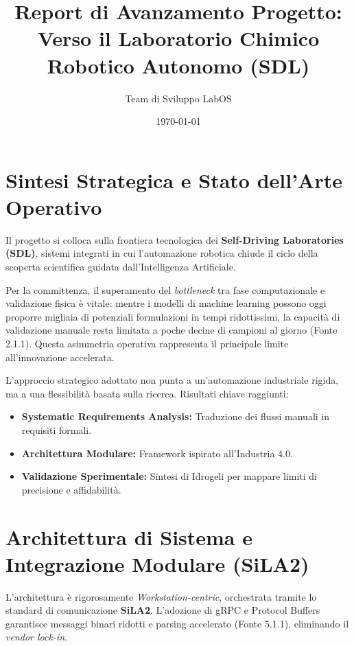 \documentclass[a4paper,11pt]{article}
\title{\textbf{Report di Avanzamento Progetto:\\Verso il Laboratorio Chimico Robotico Autonomo (SDL)}}
\author{Team di Sviluppo LabOS}
\date{\today}
\begin{document}
	
	\maketitle
	
	\tableofcontents
	\newpage
	
	\section{Sintesi Strategica e Stato dell'Arte Operativo}
	Il progetto si colloca sulla frontiera tecnologica dei \textbf{Self-Driving Laboratories (SDL)}, sistemi integrati in cui l'automazione robotica chiude il ciclo della scoperta scientifica guidata dall'Intelligenza Artificiale. 
	
	Per la committenza, il superamento del \textit{bottleneck} tra fase computazionale e validazione fisica è vitale: mentre i modelli di machine learning possono oggi proporre migliaia di potenziali formulazioni in tempi ridottissimi, la capacità di validazione manuale resta limitata a poche decine di campioni al giorno (Fonte 2.1.1). Questa asimmetria operativa rappresenta il principale limite all'innovazione accelerata.
	
	L'approccio strategico adottato non punta a un'automazione industriale rigida, ma a una flessibilità basata sulla ricerca. Risultati chiave raggiunti:
	\begin{itemize}[label=--]
		\item \textbf{Systematic Requirements Analysis:} Traduzione dei flussi manuali in requisiti formali.
		\item \textbf{Architettura Modulare:} Framework ispirato all'Industria 4.0.
		\item \textbf{Validazione Sperimentale:} Sintesi di Idrogeli per mappare limiti di precisione e affidabilità.
	\end{itemize}
	
	\section{Architettura di Sistema e Integrazione Modulare (SiLA2)}
	L'architettura è rigorosamente \textit{Workstation-centric}, orchestrata tramite lo standard di comunicazione \textbf{SiLA2}. L'adozione di gRPC e Protocol Buffers garantisce messaggi binari ridotti e parsing accelerato (Fonte 5.1.1), eliminando il \textit{vendor lock-in}.
	
\end{document}
